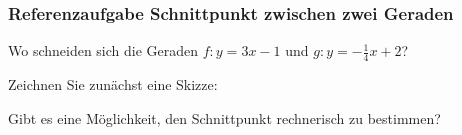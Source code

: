\subsubsection{Referenzaufgabe Schnittpunkt zwischen zwei Geraden}

Wo schneiden sich die Geraden $f: y=3x - 1$ und $g: y=-\frac{1}{4}x +
2$?

Zeichnen Sie zunächst eine Skizze:



Gibt es eine Möglichkeit, den Schnittpunkt rechnerisch zu bestimmen?

\newpage


